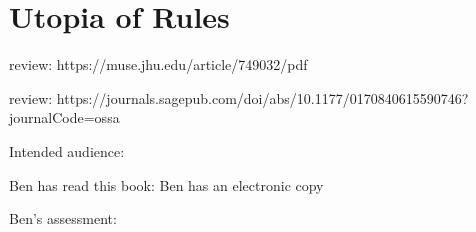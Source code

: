 \section{Utopia of Rules}

\cite{2015_Graeber}

review: https://muse.jhu.edu/article/749032/pdf

review: https://journals.sagepub.com/doi/abs/10.1177/0170840615590746?journalCode=ossa


Intended audience:

Ben has read this book: Ben has an electronic copy

Ben's assessment: 

